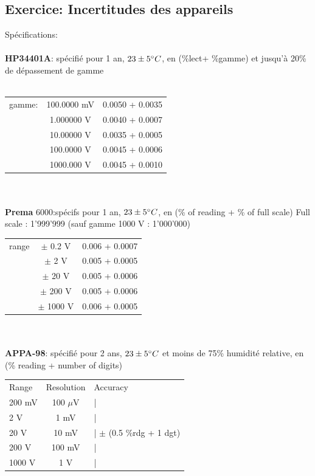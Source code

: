 \subsection{Exercice: Incertitudes des appareils }
Spécifications:\\
\\
\textbf{HP34401A}: spécifié pour 1 an, $23 \pm 5 \degree C$, en (\%lect+ \%gamme) et jusqu'à 20\% de dépassement de gamme\\
\\
\begin{tabular}{l c c}
    \hline
    gamme: & 100.0000 mV & 0.0050 + 0.0035 \\
           & 1.000000 V  & 0.0040 + 0.0007 \\
           & 10.00000 V  & 0.0035 + 0.0005 \\
           & 100.0000 V  & 0.0045 + 0.0006 \\
           & 1000.000 V  & 0.0045 + 0.0010 \\
    \hline
\end{tabular}
\\
\\
\textbf{Prema} 6000:spécifs pour 1 an, $23 \pm 5 \degree C$, en (\% of reading + \% of full scale)
Full scale : 1'999'999 (sauf gamme 1000 V : 1'000'000)
\\
\begin{tabular}{lcc}
    \hline
    range & $\pm$ 0.2 V  & 0.006 + 0.0007 \\
          & $\pm$ 2 V    & 0.005 + 0.0005 \\
          & $\pm$ 20 V   & 0.005 + 0.0006 \\
          & $\pm$ 200 V  & 0.005 + 0.0006 \\
          & $\pm$ 1000 V & 0.006 + 0.0005 \\
    \hline
\end{tabular}
\\
\\
\textbf{APPA-98}: spécifié pour 2 ans, $23 \pm 5 \degree C$ et moins de 75\% humidité relative, en (\% reading + number of digits)
\\
\begin{tabular}{lcl}
    \hline
    Range  & Resolution & Accuracy                     \\
    200 mV & 100 $\mu$V & |                            \\
    2 V    & 1 mV       & |                            \\
    20 V   & 10 mV      & |  $\pm$ (0.5 \%rdg + 1 dgt) \\
    200 V  & 100 mV     & |                            \\
    1000 V & 1 V        & |                            \\
    \hline
\end{tabular}
\\

